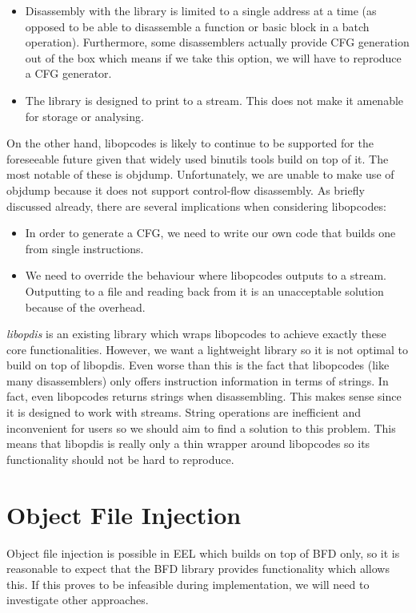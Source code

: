 \begin{itemize}
\item Disassembly with the library is limited to a single address at a time (as opposed to be able to disassemble a function or basic block in a batch operation). Furthermore, some disassemblers actually provide CFG generation out of the box which means if we take this option, we will have to reproduce a CFG generator.
\item The library is designed to print to a stream. This does not make it amenable for storage or analysing.
\end{itemize}

On the other hand, libopcodes is likely to continue to be supported for the foreseeable future given that widely used binutils tools build on top of it. The most notable of these is objdump. Unfortunately, we are unable to make use of objdump because it does not support control-flow disassembly. As briefly discussed already, there are several implications when considering libopcodes:

\begin{itemize}
\item In order to generate a CFG, we need to write our own code that builds one from single instructions.
\item We need to override the behaviour where libopcodes outputs to a stream. Outputting to a file and reading back from it is an unacceptable solution because of the overhead.
\end{itemize}

\emph{libopdis} is an existing library which wraps libopcodes to achieve exactly these core functionalities. However, we want a lightweight library so it is not optimal to build on top of libopdis. Even worse than this is the fact that libopcodes (like many disassemblers) only offers instruction information in terms of strings. In fact, even libopcodes returns strings when disassembling. This makes sense since it is designed to work with streams. String operations are inefficient and inconvenient for users so we should aim to find a solution to this problem. This means that libopdis is really only a thin wrapper around libopcodes so its functionality should not be hard to reproduce.

\section{Object File Injection}

Object file injection is possible in EEL which builds on top of BFD only, so it is reasonable to expect that the BFD library provides functionality which allows this. If this proves to be infeasible during implementation, we will need to investigate other approaches.


